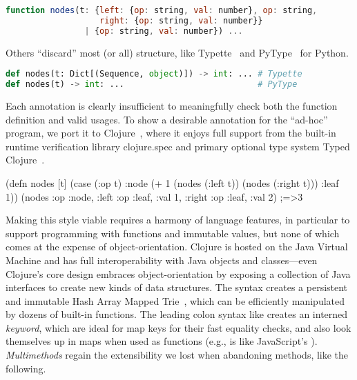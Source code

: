 \begin{lstlisting}[language=JavaScript]
function nodes(t: {left: {op: string, val: number}, op: string,
                   right: {op: string, val: number}}
                | {op: string, val: number}) ...
\end{lstlisting}

Others ``discard'' most (or all) structure, like Typette~ 
and PyType~ for Python.

\begin{lstlisting}[language=Python]
def nodes(t: Dict[(Sequence, object)]) -> int: ... # Typette
def nodes(t) -> int: ...                           # PyType
\end{lstlisting}

Each annotation is clearly insufficient to meaningfully check both the function definition
and valid usages. To show a desirable annotation for the ``ad-hoc'' program,
we port it to Clojure~, where it
enjoys full support from the built-in runtime verification library
clojure.spec and primary optional type system Typed Clojure~.

\begin{cljlisting}
(defn nodes [t] (case (:op t)
                  :node (+ 1 (nodes (:left t)) (nodes (:right t)))
                  :leaf 1))
(nodes {:op :node, :left {:op :leaf, :val 1}, :right {:op :leaf, :val 2}}) ;=>3
\end{cljlisting}

Making this style viable requires a harmony of language features, in particular to
support programming with functions and immutable values, but
none of which comes at the expense of object-orientation. Clojure is hosted on the Java Virtual Machine
and has full interoperability with Java objects and classes---even Clojure's core design embraces
object-orientation by exposing a collection of Java interfaces to create new kinds of data structures.
The  syntax creates a persistent and immutable Hash Array Mapped Trie~\cite{bagwell2001ideal},
which can be efficiently manipulated by dozens of built-in functions.
The leading colon syntax like  creates an interned \emph{keyword}, which are ideal for map keys
for their fast equality checks, and also look themselves up in maps when used as functions
(e.g.,  is like JavaScript's ).
\emph{Multimethods} regain the extensibility we lost when abandoning methods, like the following.

